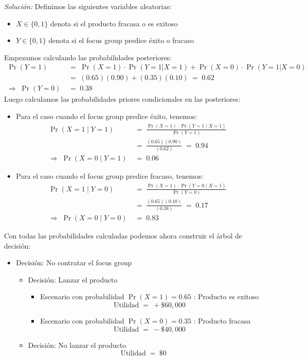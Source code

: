 \documentclass[ a4paper, twoside, 11pt]{article}
\begin{document}
\begin{problem}
\emph{Soluci\'on:} Definimos las siguientes variables aleatorias: 
\begin{itemize}
\item $X \in \{ 0, 1\}$ denota si el producto fracasa o es exitoso
\item $Y \in \{ 0, 1\}$ denota si el focus group predice \'exito o fracaso
\end{itemize}
Empezamos calculando las probabilidades posteriores:
\begin{align*}
\Pr(Y=1) \;
& = \; \Pr(X=1) \cdot \Pr(Y=1|X=1)
+ \Pr(X=0) \cdot \Pr(Y=1|X=0) \\
& = \; (0.65)(0.90) + (0.35)(0.10) \; = \; 0.62 \\
\Longrightarrow \; \Pr(Y=0) \; & = \; 0.38
\end{align*}
Luego calculamos las probabilidades priores condicionales en las posteriores: 
\begin{itemize}
\item Para el caso cuando el focus group predice \'exito, tenemos: 
\begin{align*}
\Pr( X=1 \mid Y=1 ) \;
& = \; \frac{ \Pr(X=1) \cdot \Pr( Y=1 \mid X=1 ) }{\Pr(Y=1)} \\[1ex]
& = \; \frac{ (0.65)(0.90) }{(0.62)} \; = \; 0.94 \\[1ex]
\Longrightarrow \; \Pr( X=0 \mid Y=1 ) \;
& = \; 0.06
\end{align*}
\item Para el caso cuando el focus group predice fracaso, tenemos: 
\begin{align*}
\Pr( X=1 \mid Y=0 ) \;
& = \; \frac{ \Pr(X=1) \cdot \Pr( Y=0 \mid X=1 ) }{\Pr(Y=0)} \\[1ex]
& = \; \frac{ (0.65)(0.10) }{(0.38)} \; = \; 0.17 \\[1ex]
\Longrightarrow \; \Pr( X=0 \mid Y=0 ) \;
& = \; 0.83
\end{align*}
\end{itemize}

Con todas las probabilidades calculadas podemos ahora construir el \'arbol de decisi\'on: 
\begin{itemize}

\item Decisi\'on: No contratar el focus group
\begin{itemize}
\item Decisi\'on: Lanzar el producto
\begin{itemize}
\item Escenario con probabilidad $\Pr(X=1) = 0.65$ : Producto es exitoso
\[
\text{Utilidad} \; = \; +\$60,000
\]
\item Escenario con probabilidad $\Pr(X=0) = 0.35$ : Producto fracasa
\[
\text{Utilidad} \; = \; -\$40,000
\]
\end{itemize}
\item Decisi\'on: No lanzar el producto
\[
\text{Utilidad} \; = \; \$0
\]
\end{itemize}


\end{itemize}
\end{problem}
\end{document}
